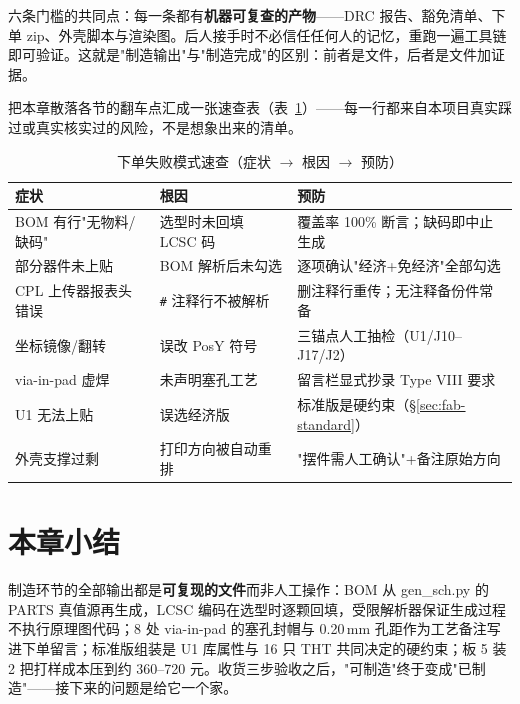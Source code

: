 六条门槛的共同点：每一条都有\textbf{机器可复查的产物}——DRC 报告、豁免清单、下单 zip、外壳脚本与渲染图。后人接手时不必信任任何人的记忆，重跑一遍工具链即可验证。这就是"制造输出"与"制造完成"的区别：前者是文件，后者是文件加证据。

把本章散落各节的翻车点汇成一张速查表（表~\ref{tab:fab-fail}）——每一行都来自本项目真实踩过或真实核实过的风险，不是想象出来的清单。

\begin{table}[htbp]
  \centering
  \caption{下单失败模式速查（症状 $\to$ 根因 $\to$ 预防）}
  \label{tab:fab-fail}
  \begin{tabular}{lp{4.2cm}p{4.2cm}}
    \toprule
    症状 & 根因 & 预防 \\
    \midrule
    BOM 有行"无物料/缺码" & 选型时未回填 LCSC 码 & 覆盖率 100\% 断言；缺码即中止生成 \\
    部分器件未上贴 & BOM 解析后未勾选 & 逐项确认"经济+免经济"全部勾选 \\
    CPL 上传器报表头错误 & \texttt{\#} 注释行不被解析 & 删注释行重传；无注释备份件常备 \\
    坐标镜像/翻转 & 误改 PosY 符号 & 三锚点人工抽检（U1/J10--J17/J2） \\
    via-in-pad 虚焊 & 未声明塞孔工艺 & 留言栏显式抄录 Type VIII 要求 \\
    U1 无法上贴 & 误选经济版 & 标准版是硬约束（\S\ref{sec:fab-standard}） \\
    外壳支撑过剩 & 打印方向被自动重排 & "摆件需人工确认"+备注原始方向 \\
    \bottomrule
  \end{tabular}
\end{table}

\section*{本章小结}
制造环节的全部输出都是\textbf{可复现的文件}而非人工操作：BOM 从 gen\_sch.py 的 PARTS 真值源再生成，LCSC 编码在选型时逐颗回填，受限解析器保证生成过程不执行原理图代码；8 处 via-in-pad 的塞孔封帽与 0.20\,mm 孔距作为工艺备注写进下单留言；标准版组装是 U1 库属性与 16 只 THT 共同决定的硬约束；板 5 装 2 把打样成本压到约 360--720 元。收货三步验收之后，"可制造"终于变成"已制造"——接下来的问题是给它一个家。
